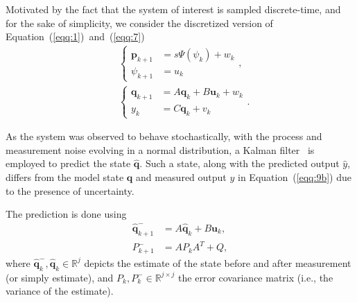 \documentclass[letterpaper,10pt,conference]{ieeeconf}
\begin{document}
Motivated by the fact that the system of interest is sampled discrete-time, and for the sake of simplicity, we consider the discretized version of Equation~(\ref{eqq:1})~and~(\ref{eqq:7})
\begin{subequations}\label{eqq:9}\begin{align}
  &\begin{cases}\label{eqq:9a}
  \mathbf{p}_{k+1}&=s\Psi(\psi_k)+w_k\\
  \psi_{k+1}&=u_k
  \end{cases},\\
  &\begin{cases}\label{eqq:9b}
  \mathbf{q}_{k+1}&=A\mathbf{q}_{k}+B\mathbf{u}_{k}+w_k\\
  y_k&=C\mathbf{q}_k+v_k
  \end{cases}.
\end{align}\end{subequations}

As the system was observed to behave stochastically, with the process and measurement noise evolving in a normal distribution, a Kalman filter~\cite{stengel1994optimal, simon2006optimal} is employed to predict the state $\hat{\mathbf{q}}$. Such a state, along with the predicted output $\hat{y}$, differs from the model state $\mathbf{q}$ and measured output $y$ in Equation~(\ref{eqq:9b}) due to the presence of uncertainty.

The prediction is done using
\begin{subequations}\label{eqq:10}\begin{align}
  \hat{\mathbf{q}}_{k+1}^-&=A\hat{\mathbf{q}}_{k}+B\mathbf{u}_k,\label{eqq:10a}\\
  P_{k+1}^-&=AP_kA^T+Q,\label{eqq:10b}
\end{align}\end{subequations}
where $\hat{\mathbf{q}}_k^-,\hat{\mathbf{q}}_k\in\mathbb{R}^j$ depicts the estimate of the state before and after measurement (or simply estimate), and $P_k,P_k^-\in\mathbb{R}^{j\times j}$ the error covariance matrix (i.e., the variance of the estimate). 
\end{document}
